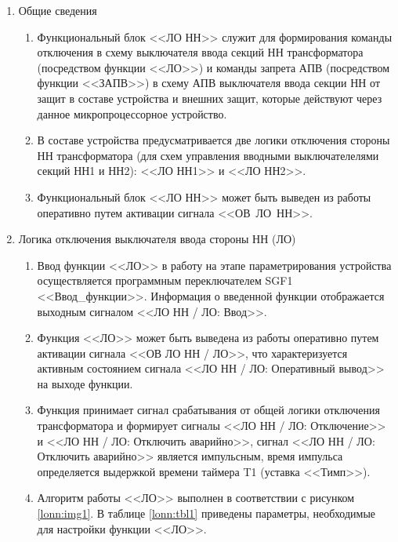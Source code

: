 \documentclass[a4paper, 12pt,table, hidelinks, DIV=calc]{extarticle} %
\begin{document}
\color{black}

\begin{enumerate}[label=\arabic{section}.\arabic{subsection}.\arabic{enumi}, labelsep=4pt, leftmargin=0pt, itemindent=57pt, itemsep=0pt, parsep=5pt] %


\item Общие сведения

\begin{enumerate}[label=\arabic{section}.\arabic{subsection}.\arabic{enumi}.\arabic*, labelsep=4pt, leftmargin=0em, itemindent=65pt, parsep=0pt]

\item
Функциональный блок <<ЛО НН>> служит для формирования команды отключения в схему выключателя ввода секций НН трансформатора (посредством функции <<ЛО>>) и команды запрета АПВ (посредством функции <<ЗАПВ>>) в схему АПВ выключателя ввода секции НН от защит в составе устройства и внешних защит, которые действуют через данное микропроцессорное устройство.
\item 
В составе устройства предусматривается две логики отключения стороны НН трансформатора (для схем управления вводными выключателелями секций НН1 и НН2): <<ЛО НН1>> и <<ЛО НН2>>.
\item
Функциональный блок <<ЛО НН>> может быть выведен из работы оперативно путем активации сигнала <<ОВ~ЛО~НН>>.

\end{enumerate}


\item Логика отключения выключателя ввода стороны НН (ЛО)

\begin{enumerate}[label=\arabic{section}.\arabic{subsection}.\arabic{enumi}.\arabic*, labelsep=4pt, leftmargin=0em, itemindent=65pt, parsep=0pt]

\item
Ввод функции <<ЛО>> в работу на этапе параметрирования устройства осуществляется программным переключателем SGF1 <<Ввод\_функции>>. Информация о введенной функции отображается выходным сигналом <<ЛО НН / ЛО: Ввод>>.
\item
Функция <<ЛО>> может быть выведена из работы оперативно путем активации сигнала <<ОВ ЛО НН / ЛО>>, что характеризуется активным состоянием сигнала <<ЛО НН / ЛО: Оперативный вывод>> на выходе функции.  
\item
Функция принимает сигнал срабатывания от общей логики отключения трансформатора и формирует сигналы <<ЛО НН / ЛО: Отключение>> и <<ЛО НН / ЛО: Отключить аварийно>>, сигнал <<ЛО НН / ЛО: Отключить аварийно>> является импульсным, время импульса определяется выдержкой времени таймера T1 (уставка <<Тимп>>).
\item
Алгоритм работы <<ЛО>> выполнен в соответствии с рисунком \ref{lonn:img1}. В таблице \ref{lonn:tbl1} приведены параметры, необходимые для настройки функции <<ЛО>>.


\end{enumerate}
\end{enumerate}
\end{document}
